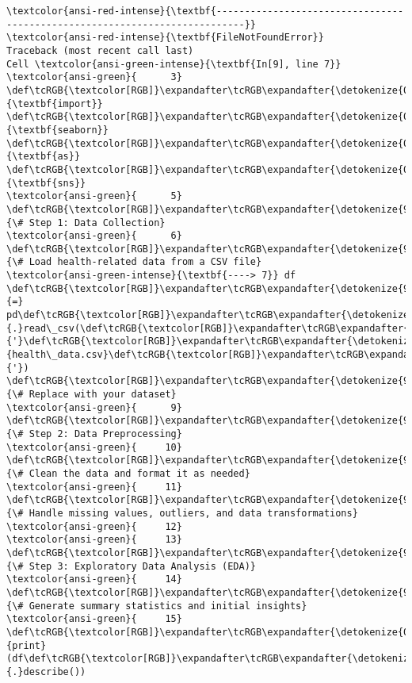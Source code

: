\documentclass[11pt]{article}
\begin{document}
    \begin{Verbatim}[commandchars=\\\{\}, frame=single, framerule=2mm, rulecolor=\color{outerrorbackground}]
\textcolor{ansi-red-intense}{\textbf{---------------------------------------------------------------------------}}
\textcolor{ansi-red-intense}{\textbf{FileNotFoundError}}                         Traceback (most recent call last)
Cell \textcolor{ansi-green-intense}{\textbf{In[9], line 7}}
\textcolor{ansi-green}{      3} \def\tcRGB{\textcolor[RGB]}\expandafter\tcRGB\expandafter{\detokenize{0,135,0}}{\textbf{import}} \def\tcRGB{\textcolor[RGB]}\expandafter\tcRGB\expandafter{\detokenize{0,0,255}}{\textbf{seaborn}} \def\tcRGB{\textcolor[RGB]}\expandafter\tcRGB\expandafter{\detokenize{0,135,0}}{\textbf{as}} \def\tcRGB{\textcolor[RGB]}\expandafter\tcRGB\expandafter{\detokenize{0,0,255}}{\textbf{sns}}
\textcolor{ansi-green}{      5} \def\tcRGB{\textcolor[RGB]}\expandafter\tcRGB\expandafter{\detokenize{95,135,135}}{\# Step 1: Data Collection}
\textcolor{ansi-green}{      6} \def\tcRGB{\textcolor[RGB]}\expandafter\tcRGB\expandafter{\detokenize{95,135,135}}{\# Load health-related data from a CSV file}
\textcolor{ansi-green-intense}{\textbf{----> 7}} df \def\tcRGB{\textcolor[RGB]}\expandafter\tcRGB\expandafter{\detokenize{98,98,98}}{=} pd\def\tcRGB{\textcolor[RGB]}\expandafter\tcRGB\expandafter{\detokenize{98,98,98}}{.}read\_csv(\def\tcRGB{\textcolor[RGB]}\expandafter\tcRGB\expandafter{\detokenize{175,0,0}}{'}\def\tcRGB{\textcolor[RGB]}\expandafter\tcRGB\expandafter{\detokenize{175,0,0}}{health\_data.csv}\def\tcRGB{\textcolor[RGB]}\expandafter\tcRGB\expandafter{\detokenize{175,0,0}}{'})  \def\tcRGB{\textcolor[RGB]}\expandafter\tcRGB\expandafter{\detokenize{95,135,135}}{\# Replace with your dataset}
\textcolor{ansi-green}{      9} \def\tcRGB{\textcolor[RGB]}\expandafter\tcRGB\expandafter{\detokenize{95,135,135}}{\# Step 2: Data Preprocessing}
\textcolor{ansi-green}{     10} \def\tcRGB{\textcolor[RGB]}\expandafter\tcRGB\expandafter{\detokenize{95,135,135}}{\# Clean the data and format it as needed}
\textcolor{ansi-green}{     11} \def\tcRGB{\textcolor[RGB]}\expandafter\tcRGB\expandafter{\detokenize{95,135,135}}{\# Handle missing values, outliers, and data transformations}
\textcolor{ansi-green}{     12} 
\textcolor{ansi-green}{     13} \def\tcRGB{\textcolor[RGB]}\expandafter\tcRGB\expandafter{\detokenize{95,135,135}}{\# Step 3: Exploratory Data Analysis (EDA)}
\textcolor{ansi-green}{     14} \def\tcRGB{\textcolor[RGB]}\expandafter\tcRGB\expandafter{\detokenize{95,135,135}}{\# Generate summary statistics and initial insights}
\textcolor{ansi-green}{     15} \def\tcRGB{\textcolor[RGB]}\expandafter\tcRGB\expandafter{\detokenize{0,135,0}}{print}(df\def\tcRGB{\textcolor[RGB]}\expandafter\tcRGB\expandafter{\detokenize{98,98,98}}{.}describe())


\end{Verbatim}
\end{document}
